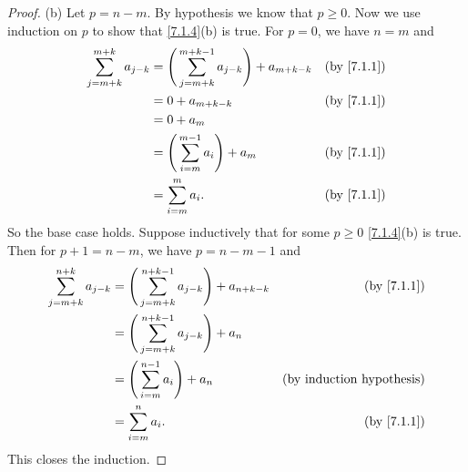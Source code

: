 \begin{proof}{(b)}
  Let \(p = n - m\).
  By hypothesis we know that \(p \geq 0\).
  Now we use induction on \(p\) to show that \cref{7.1.4}(b) is true.
  For \(p = 0\), we have \(n = m\) and
  \begin{align*}
    \sum_{j = m + k}^{m + k} a_{j - k} & = \Bigg(\sum_{j = m + k}^{m + k - 1} a_{j - k}\Bigg) + a_{m + k - k} & \text{(by \cref{7.1.1})} \\
                                       & = 0 + a_{m + k - k}                                                  & \text{(by \cref{7.1.1})} \\
                                       & = 0 + a_m                                                                                       \\
                                       & = \Bigg(\sum_{i = m}^{m - 1} a_i\Bigg) + a_m                         & \text{(by \cref{7.1.1})} \\
                                       & = \sum_{i = m}^m a_i.                                                & \text{(by \cref{7.1.1})}
  \end{align*}
  So the base case holds.
  Suppose inductively that for some \(p \geq 0\) \cref{7.1.4}(b) is true.
  Then for \(p + 1 = n - m\), we have \(p = n - m - 1\) and
  \begin{align*}
    \sum_{j = m + k}^{n + k} a_{j - k} & = \Bigg(\sum_{j = m + k}^{n + k - 1} a_{j - k}\Bigg) + a_{n + k - k} & \text{(by \cref{7.1.1})}         \\
                                       & = \Bigg(\sum_{j = m + k}^{n + k - 1} a_{j - k}\Bigg) + a_n                                              \\
                                       & = \Bigg(\sum_{i = m}^{n - 1} a_i\Bigg) + a_n                         & \text{(by induction hypothesis)} \\
                                       & = \sum_{i = m}^n a_i.                                                & \text{(by \cref{7.1.1})}
  \end{align*}
  This closes the induction.
\end{proof}

